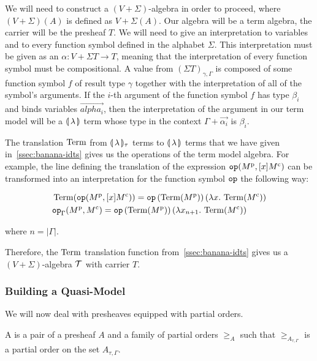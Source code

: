 We will need to construct a $(V+\Sigma)$-algebra in order to proceed, where
$(V+\Sigma)(A)$ is defined as $V + \Sigma(A)$. Our algebra will be a term
algebra, the carrier will be the presheaf $T$. We will need to give an
interpretation to variables and to every function symbol defined in the
alphabet $\Sigma$. This interpretation must be given as an
$\alpha : V + \Sigma T \to T$, meaning that the interpretation of every
function symbol must be compositional. A value from
$(\Sigma T)_{\gamma,\Gamma}$ is composed of some function symbol $f$ of
result type $\gamma$ together with the interpretation of all of the
symbol's arguments. If the $i$-th argument of the function symbol $f$ has
type $\beta_i$ and binds variables $\vec{alpha_i}$, then the interpretation
of the argument in our term model will be a ${\llparenthesis \, \lambda \, \rrparenthesis}$ term whose type in the
context $\Gamma + \vec{\alpha_i}$ is $\beta_i$.

The translation $\operatorname{Term}$ from $\llparenthesis \, \lambda \, \rrparenthesis_\tau$ terms to
$\llparenthesis \, \lambda \, \rrparenthesis$ terms that we have given in~\ref{ssec:banana-idts} gives
us the operations of the term model algebra. For example, the line defining
the translation of the expression $\mathtt{op}(M^{\mathrm{p}}, [x] M^{\mathrm{c}})$ can
be transformed into an interpretation for the function symbol $\mathtt{op}$ the
following way:

\begin{align*}
  & \operatorname{Term}(\mathtt{op}(M^{\mathrm{p}}, [x] M^{\mathrm{c}})) =
    \mathtt{op}\,(\operatorname{Term}(M^{\mathrm{p}}))\,(\lambda x.\, \operatorname{Term}(M^{\mathrm{c}})) \\
  & \mathtt{op}_\Gamma(M^{\mathrm{p}}, M^{\mathrm{c}}) =
    \mathtt{op}\,(\operatorname{Term}(M^{\mathrm{p}}))\,(\lambda x_{n+1}.\, \operatorname{Term}(M^{\mathrm{c}})) \\
\end{align*}

where $n = |\Gamma|$.

Therefore, the $\operatorname{Term}$ translation function from~\ref{ssec:banana-idts}
gives us a $(V+\Sigma)$-algebra $\mathcal{T}$ with carrier $T$.


\subsubsection{Building a Quasi-Model}
\label{sssec:quasi-model}

We will now deal with presheaves equipped with partial orders.

\begin{definition}
  A  is a pair of a presheaf
  $A$ and a family of partial orders $\ge_A$ such that
  $\ge_{A_{\tau,\Gamma}}$ is a partial order on the set $A_{\tau,\Gamma}$.
\end{definition}

